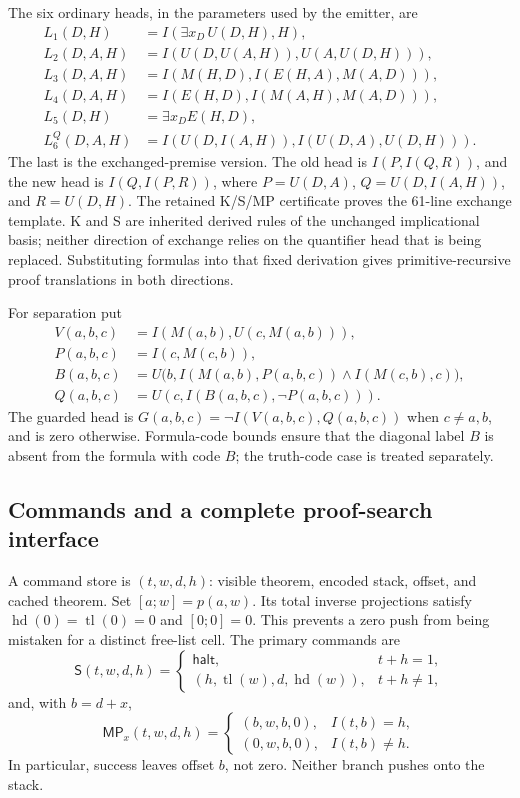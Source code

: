 \documentclass[11pt,letterpaper]{article}
\newcommand{\MP}{\mathsf{MP}}
\newcommand{\Shift}{\mathsf{S}}
\begin{document}
The six ordinary heads, in the parameters used by the emitter, are
\begin{align*}
 L_1(D,H)&=I(\exists x_D\,U(D,H),H),\\
 L_2(D,A,H)&=I(U(D,U(A,H)),U(A,U(D,H))),\\
 L_3(D,A,H)&=I(M(H,D),I(E(H,A),M(A,D))),\\
 L_4(D,A,H)&=I(E(H,D),I(M(A,H),M(A,D))),\\
 L_5(D,H)&=\exists x_D E(H,D),\\
 L_6^{Q}(D,A,H)&=I(U(D,I(A,H)),I(U(D,A),U(D,H))).
\end{align*}
The last is the exchanged-premise version. The old head is
$I(P,I(Q,R))$, and the new head is $I(Q,I(P,R))$, where
$P=U(D,A)$, $Q=U(D,I(A,H))$, and $R=U(D,H)$.
The retained K/S/MP certificate proves the 61-line exchange template.
K and S are inherited derived rules of the unchanged implicational
basis; neither direction of exchange relies on the quantifier head that
is being replaced. Substituting formulas into that fixed derivation
gives primitive-recursive proof translations in both directions.

For separation put
\begin{align*}
 V(a,b,c)&=I(M(a,b),U(c,M(a,b))),\\
 P(a,b,c)&=I(c,M(c,b)),\\
 B(a,b,c)&=U\bigl(b,
 I(M(a,b),P(a,b,c))\wedge I(M(c,b),c)\bigr),\\
 Q(a,b,c)&=U(c,I(B(a,b,c),\neg P(a,b,c))).
\end{align*}
The guarded head is $G(a,b,c)=\neg I(V(a,b,c),Q(a,b,c))$
when $c\ne a,b$, and is zero otherwise. Formula-code bounds ensure that
the diagonal label $B$ is absent from the formula with code $B$; the
truth-code case is treated separately.

\subsection{Commands and a complete proof-search interface}

A command store is $(t,w,d,h)$: visible theorem, encoded stack, offset,
and cached theorem. Set $[a;w]=p(a,w)$. Its total inverse projections
satisfy $\operatorname{hd}(0)=\operatorname{tl}(0)=0$ and $[0;0]=0$.
This prevents a zero push from being mistaken for a distinct free-list
cell. The primary commands are
\[
 \Shift(t,w,d,h)=
 \begin{cases}\mathsf{halt},&t+h=1,\\
 (h,\operatorname{tl}(w),d,\operatorname{hd}(w)),&t+h\ne1,
 \end{cases}
\]
and, with $b=d+x$,
\[
 \MP_x(t,w,d,h)=
 \begin{cases}(b,w,b,0),&I(t,b)=h,\\
 (0,w,b,0),&I(t,b)\ne h.
 \end{cases}
\]
In particular, success leaves offset $b$, not zero. Neither branch pushes
onto the stack.
\end{document}
